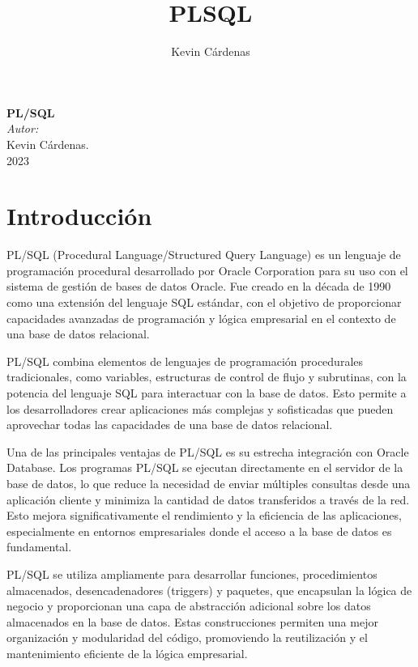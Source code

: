 \documentclass[executivepaper]{article}
\title{PLSQL}
\author{Kevin Cárdenas}
\begin{document}
\begin{titlepage}
    \begin{center}
        {\Huge \textbf{PL/SQL}}
        \\[18cm]

        \large\emph{Autor:}\\
        Kevin Cárdenas.
        \\[1cm]
        {\large 2023}
    \end{center}
\end{titlepage}
\newpage
\tableofcontents
\newpage

\section{Introducción}
PL/SQL (Procedural Language/Structured Query Language) es un lenguaje de programación procedural desarrollado por Oracle Corporation para su uso con el sistema de gestión de bases de datos Oracle. Fue creado en la década de 1990 como una extensión del lenguaje SQL estándar, con el objetivo de proporcionar capacidades avanzadas de programación y lógica empresarial en el contexto de una base de datos relacional.

PL/SQL combina elementos de lenguajes de programación procedurales tradicionales, como variables, estructuras de control de flujo y subrutinas, con la potencia del lenguaje SQL para interactuar con la base de datos. Esto permite a los desarrolladores crear aplicaciones más complejas y sofisticadas que pueden aprovechar todas las capacidades de una base de datos relacional.

Una de las principales ventajas de PL/SQL es su estrecha integración con Oracle Database. Los programas PL/SQL se ejecutan directamente en el servidor de la base de datos, lo que reduce la necesidad de enviar múltiples consultas desde una aplicación cliente y minimiza la cantidad de datos transferidos a través de la red. Esto mejora significativamente el rendimiento y la eficiencia de las aplicaciones, especialmente en entornos empresariales donde el acceso a la base de datos es fundamental.

PL/SQL se utiliza ampliamente para desarrollar funciones, procedimientos almacenados, desencadenadores (triggers) y paquetes, que encapsulan la lógica de negocio y proporcionan una capa de abstracción adicional sobre los datos almacenados en la base de datos. Estas construcciones permiten una mejor organización y modularidad del código, promoviendo la reutilización y el mantenimiento eficiente de la lógica empresarial.
\end{document}
